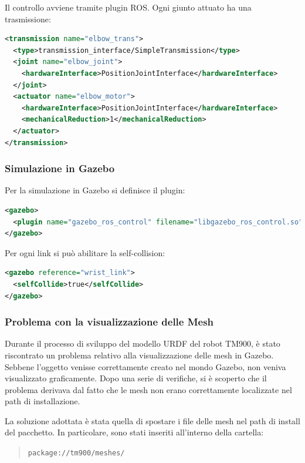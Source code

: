 \documentclass[11pt]{report}
\begin{document}
Il controllo avviene tramite plugin ROS. Ogni giunto attuato ha una trasmissione:

\begin{lstlisting}[language=xml]
<transmission name="elbow_trans">
  <type>transmission_interface/SimpleTransmission</type>
  <joint name="elbow_joint">
    <hardwareInterface>PositionJointInterface</hardwareInterface>
  </joint>
  <actuator name="elbow_motor">
    <hardwareInterface>PositionJointInterface</hardwareInterface>
    <mechanicalReduction>1</mechanicalReduction>
  </actuator>
</transmission>
\end{lstlisting}

\subsubsection*{Simulazione in Gazebo}

Per la simulazione in Gazebo si definisce il plugin:

\begin{lstlisting}[language=xml]
<gazebo>
  <plugin name="gazebo_ros_control" filename="libgazebo_ros_control.so"/>
</gazebo>
\end{lstlisting}

Per ogni link si può abilitare la self-collision:

\begin{lstlisting}[language=xml]
<gazebo reference="wrist_link">
  <selfCollide>true</selfCollide>
</gazebo>
\end{lstlisting}

\subsubsection*{Problema con la visualizzazione delle Mesh}

Durante il processo di sviluppo del modello URDF del robot TM900, è stato riscontrato un problema relativo alla visualizzazione delle mesh in Gazebo. Sebbene l'oggetto venisse correttamente creato nel mondo Gazebo, non veniva visualizzato graficamente. Dopo una serie di verifiche, si è scoperto che il problema derivava dal fatto che le mesh non erano correttamente localizzate nel path di installazione.

La soluzione adottata è stata quella di spostare i file delle mesh nel path di install del pacchetto. In particolare, sono stati inseriti all'interno della cartella:

\begin{quote}
\texttt{package://tm900/meshes/}
\end{quote}
\end{document}
